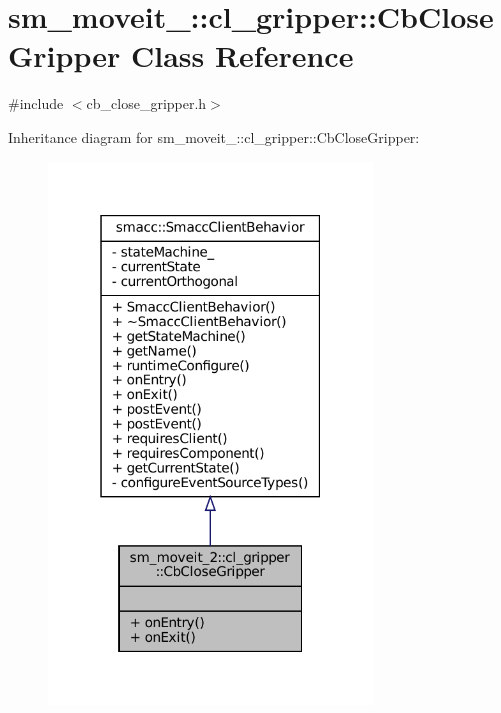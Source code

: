 \hypertarget{classsm__moveit__2_1_1cl__gripper_1_1CbCloseGripper}{}\section{sm\+\_\+moveit\+\_\+:\+:cl\+\_\+gripper\+:\+:Cb\+Close\+Gripper Class Reference}
\label{classsm__moveit__2_1_1cl__gripper_1_1CbCloseGripper}


{\ttfamily \#include $<$cb\+\_\+close\+\_\+gripper.\+h$>$}



Inheritance diagram for sm\+\_\+moveit\+\_\+:\+:cl\+\_\+gripper\+:\+:Cb\+Close\+Gripper\+:
\nopagebreak
\begin{figure}[H]
\begin{center}
\leavevmode
\includegraphics[width=244pt]{classsm__moveit__2_1_1cl__gripper_1_1CbCloseGripper__inherit__graph}
\end{center}
\end{figure}


